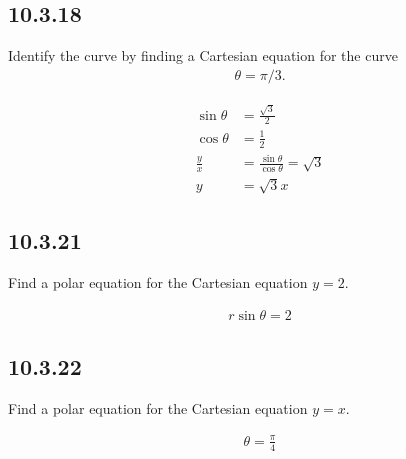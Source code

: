 \subsection*{10.3.18}
Identify the curve by finding a Cartesian equation for the curve
\begin{align*}
  \theta = \pi/3.
\end{align*}

\begin{mdframed}
  \begin{align*}
    \sin\theta &= \frac{\sqrt{3}}{2}\\
    \cos\theta &= \frac{1}{2}\\
    \frac{y}{x} &= \frac{\sin\theta}{\cos\theta} = \sqrt{3}\\
    y &= \sqrt{3}x
  \end{align*}
\end{mdframed}

\subsection*{10.3.21}
Find a polar equation for the Cartesian equation $y = 2$.
\begin{mdframed}
  \begin{align*}
    r\sin\theta = 2
  \end{align*}
\end{mdframed}

\subsection*{10.3.22}
Find a polar equation for the Cartesian equation $y = x$.
\begin{mdframed}
  \begin{align*}
    \theta = \frac{\pi}{4}
  \end{align*}
\end{mdframed}

